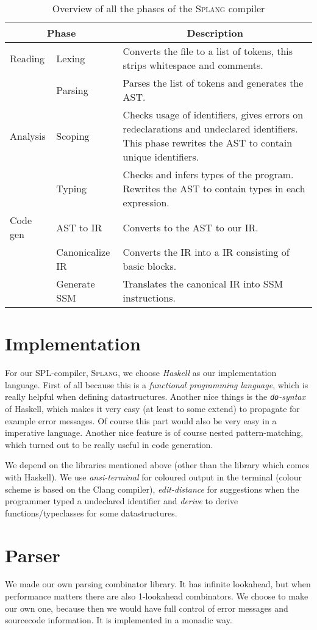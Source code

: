\documentclass[14pt]{amsart}
\newcommand{\splang}{\textsc{Splang}\xspace}
\begin{document}
\begin{table}
\begin{tabular}{l l p{8cm}}
\multicolumn{2}{c}{Phase} & \multicolumn{1}{c}{Description}\\
\hline Reading
 & Lexing & Converts the file to a list of tokens, this strips whitespace and comments. \\
 & Parsing & Parses the list of tokens and generates the AST. \\
\hline Analysis
 & Scoping & Checks usage of identifiers, gives errors on redeclarations and undeclared identifiers. This phase rewrites the AST to contain unique identifiers. \\
 & Typing & Checks and infers types of the program. Rewrites the AST to contain types in each expression. \\
\hline Code gen
 & AST to IR & Converts to the AST to our IR. \\
 & Canonicalize IR & Converts the IR into a IR consisting of basic blocks. \\
 & Generate SSM & Translates the canonical IR into SSM instructions.
\end{tabular}
\caption{Overview of all the phases of the \splang compiler}
\label{tab:overview}
\end{table}


\section{Implementation}
For our SPL-compiler, \splang, we choose \emph{Haskell} as our implementation language. First of all because this is a \emph{functional programming language}, which is really helpful when defining datastructures. Another nice things is the \emph{\texttt{do}-syntax} of Haskell, which makes it very easy (at least to some extend) to propagate for example error messages. Of course this part would also be very easy in a imperative language. Another nice feature is of course nested pattern-matching, which turned out to be really useful in code generation.

We depend on the libraries mentioned above (other than the library which comes with Haskell). We use \emph{ansi-terminal} for coloured output in the terminal (colour scheme is based on the {\sc Clang} compiler), \emph{edit-distance} for suggestions when the programmer typed a undeclared identifier and \emph{derive} to derive functions/typeclasses for some datastructures.

\section{Parser}
We made our own parsing combinator library. It has infinite lookahead, but when performance matters there are also 1-lookahead combinators. We choose to make our own one, because then we would have full control of error messages and sourcecode information. It is implemented in a monadic way.
\end{document}
